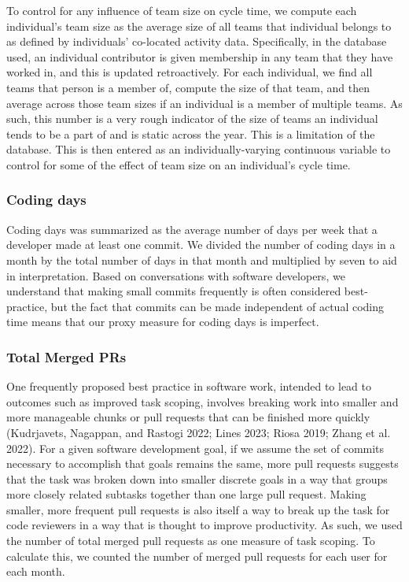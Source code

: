 \documentclass[
]{article}
\begin{document}
To control for any influence of team size on cycle time, we compute each
individual's team size as the average size of all teams that individual
belongs to as defined by individuals' co-located activity data.
Specifically, in the database used, an individual contributor is given
membership in any team that they have worked in, and this is updated
retroactively. For each individual, we find all teams that person is a
member of, compute the size of that team, and then average across those
team sizes if an individual is a member of multiple teams. As such, this
number is a very rough indicator of the size of teams an individual
tends to be a part of and is static across the year. This is a
limitation of the database. This is then entered as an
individually-varying continuous variable to control for some of the
effect of team size on an individual's cycle time.

\subsubsection{Coding days}\label{coding-days}

Coding days was summarized as the average number of days per week that a
developer made at least one commit. We divided the number of coding days
in a month by the total number of days in that month and multiplied by
seven to aid in interpretation. Based on conversations with software
developers, we understand that making small commits frequently is often
considered best-practice, but the fact that commits can be made
independent of actual coding time means that our proxy measure for
coding days is imperfect.

\subsubsection{Total Merged PRs}\label{total-merged-prs}

One frequently proposed best practice in software work, intended to lead
to outcomes such as improved task scoping, involves breaking work into
smaller and more manageable chunks or pull requests that can be finished
more quickly (Kudrjavets, Nagappan, and Rastogi 2022; Lines 2023; Riosa
2019; Zhang et al. 2022). For a given software development goal, if we
assume the set of commits necessary to accomplish that goals remains the
same, more pull requests suggests that the task was broken down into
smaller discrete goals in a way that groups more closely related
subtasks together than one large pull request. Making smaller, more
frequent pull requests is also itself a way to break up the task for
code reviewers in a way that is thought to improve productivity. As
such, we used the number of total merged pull requests as one measure of
task scoping. To calculate this, we counted the number of merged pull
requests for each user for each month.
\end{document}
